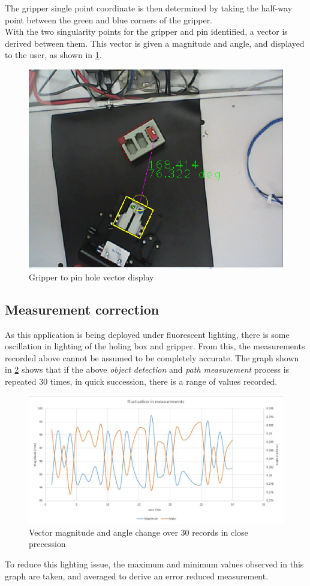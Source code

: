 \documentclass[11pt,a4paper]{report}
\begin{document}
The gripper single point coordinate is then determined by taking the half-way point between the green and blue corners of the gripper.\\

With the two singularity points for the gripper and pin identified, a vector is derived between them. This vector is given a magnitude and angle, and displayed to the user, as shown in \cref{fig:vector}.
\begin{figure}[h]
\centering
\includegraphics[width=0.5\linewidth]{vector}
\caption{Gripper to pin hole vector display}
\label{fig:vector}
\end{figure}
 \FloatBarrier

\subsection{Measurement correction}
As this application is being deployed under fluorescent lighting, there is some oscillation in lighting of the holing box and gripper. From this, the measurements recorded above cannot be assumed to be completely accurate. The graph shown in \cref{fig:measumrnetflux} shows that if the above \textit{object detection} and \textit{path measurement} process is repeated 30 times, in quick succession, there is a range of values recorded.\\ 

\begin{figure}[h]
\centering
\includegraphics[width=0.7\linewidth]{measumrnetflux}
\caption{Vector magnitude and angle change over 30 records in close precession}
\label{fig:measumrnetflux}
\end{figure}
To reduce this lighting issue, the maximum and minimum values observed in this graph are taken, and averaged to derive an error reduced measurement. 
 
\end{document}
